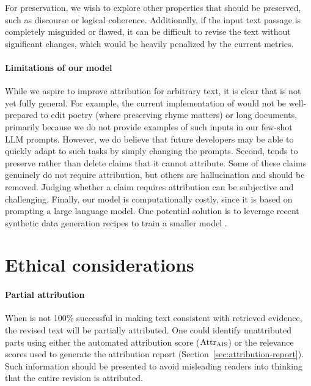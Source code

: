 For preservation, we wish to explore other properties that should be preserved, such as discourse or logical coherence. Additionally, if the input text passage is completely misguided or flawed, it can be difficult to revise the text without significant changes, which would be heavily penalized by the current metrics.

\paragraph{Limitations of our model}
While we aspire to improve attribution for arbitrary text, it is clear that \approach{} is not yet fully general. For example, the current implementation of \approach{} would not be well-prepared to edit poetry (where preserving rhyme matters) or long documents, primarily because we do not provide examples of such inputs in our few-shot LLM prompts. However, we do believe that future developers may be able to quickly adapt \approach{} to such tasks by simply changing the prompts. Second, \approach{} tends to preserve rather than delete claims that it cannot attribute. Some of these claims genuinely do not require attribution, but others are hallucination and should be removed. Judging whether a claim requires attribution can be subjective and challenging. Finally, our model is computationally costly, since it is based on prompting a large language model. One potential solution is to leverage recent synthetic data generation recipes to train a smaller model \cite{lee2021neural,Schick2022PEER}.

\section{Ethical considerations}

\paragraph{Partial attribution}
When \approach{} is not 100\% successful in making text consistent with retrieved evidence, the revised text will be partially attributed.
One could identify unattributed parts using either the automated attribution score ($\text{Attr}_\text{AIS}{}$) or the relevance scores used to generate the attribution report (Section~\ref{sec:attribution-report}).
Such information should be presented to avoid misleading readers into thinking that the entire revision is attributed.

